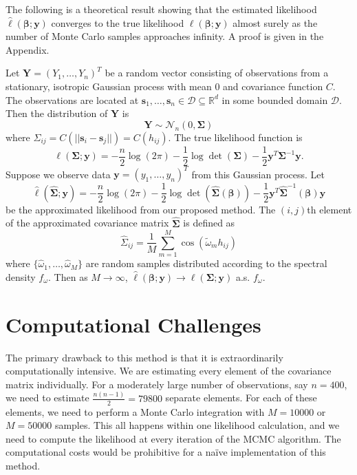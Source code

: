 The following is a theoretical result showing that the estimated likelihood $\hat{\ell}(\bm{\beta}; \bm{y})$ converges to the true likelihood $\ell(\bm{\beta}; \bm{y})$ almost surely as the number of Monte Carlo samples approaches infinity. A proof is given in the Appendix.

\begin{theorem}
	Let $\bm{Y} = (Y_1, \dots, Y_n)^T$ be a random vector consisting of observations from a stationary, isotropic Gaussian process with mean 0 and covariance function $C$. The observations are located at $\bm{s}_1, \dots, \bm{s}_n \in \mathcal{D} \subseteq \mathbb{R}^d$ in some bounded domain $\mathcal{D}$. Then the distribution of $\bm{Y}$ is
	\[
		\bm{Y} \sim \mathcal{N}_n(0, \bm{\Sigma})
	\]
	where $\Sigma_{ij} = C(||\bm{s}_i - \bm{s}_j||) = C(h_{ij})$. The true likelihood function is
	\[
		\ell(\bm{\Sigma}; \bm{y}) = -\frac{n}{2} \log(2\pi) - \frac{1}{2} \log \det (\bm{\Sigma}) - \frac{1}{2} \bm{y}^T \bm{\Sigma}^{-1} \bm{y}.
	\]
	Suppose we observe data $\bm{y} = (y_1, \dots, y_n)^T$ from this Gaussian process. Let
	\[
		\hat{\ell}(\widehat{\bm{\Sigma}}; \bm{y}) = -\frac{n}{2} \log(2\pi) - \frac{1}{2} \log \det (\widehat{\bm{\Sigma}}(\bm{\beta})) - \frac{1}{2} \bm{y}^T \widehat{\bm{\Sigma}}^{-1}(\bm{\beta}) \bm{y}
	\]
	be the approximated likelihood from our proposed method. The $(i,j)$th element of the approximated covariance matrix $\widehat{\bm{\Sigma}}$ is defined as
	\[
		\widehat{\Sigma}_{ij} = \frac{1}{M} \sum_{m=1}^M \cos(\widetilde{\omega}_m h_{ij})
	\]
	where $\{\widehat{\omega}_1, \dots, \widehat{\omega}_M\}$ are random samples distributed according to the spectral density $f_\omega$. Then as $M \to \infty$, $\hat{\ell}(\bm{\beta}; \bm{y}) \to \ell(\bm{\Sigma}; \bm{y})$ a.s. $f_\omega$.
\end{theorem}




\section{Computational Challenges} %
\label{sec:computational_challenges}

The primary drawback to this method is that it is extraordinarily computationally intensive. We are estimating every element of the covariance matrix individually. For a moderately large number of observations, say $n = 400$, we need to estimate $\frac{n(n-1)}{2} = 79800$ separate elements. For each of these elements, we need to perform a Monte Carlo integration with $M = 10000$ or $M = 50000$ samples. This all happens within one likelihood calculation, and we need to compute the likelihood at every iteration of the MCMC algorithm. The computational costs would be prohibitive for a na\"{i}ve implementation of this method.

